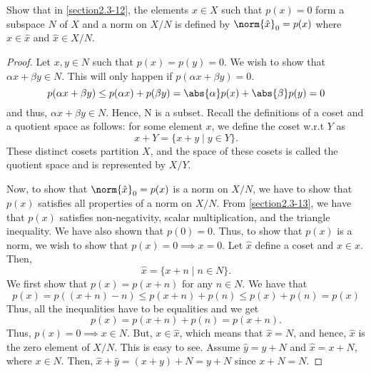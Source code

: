 \begin{question}
    Show that in \ref{section2.3-12}, the elements $x \in X$ such that $p(x) = 0$ form a subspace $N$ of $X$ and a norm on $X/N$ is defined by $\norm{\hat{x}}_0 = p(x)$ where $x \in \hat{x}$ and $\hat{x} \in X/N$.
    \label{section2.3-13}
\end{question}
\begin{proof}
    Let $x , y \in N$ such that $p(x) = p(y) = 0$. We wish to show that $\alpha x + \beta y \in N$. This will only happen if $p(\alpha x + \beta y) = 0$.
    \[p(\alpha x + \beta y) \leq p(\alpha x) + p(\beta y) = \abs{\alpha} p(x) + \abs{\beta} p(y) = 0\]
    and thus, $\alpha x + \beta y \in N$. Hence, N is a subset. Recall the definitions of a coset and a quotient space as follows: for some element $x$, we define the coset w.r.t $Y$ as
    \[x + Y = \{x + y \mid  y \in Y\}.\]
    These distinct cosets partition $X$, and the space of these cosets is called the quotient space and is represented by $X/Y$.

    Now, to show that $\norm{\hat{x}}_0 = p(x)$ is a norm on $X/N$, we have to show that $p(x)$ satisfies all properties of a norm on $X/N$. From \ref{section2.3-13}, we have that $p(x)$ satisfies non-negativity, scalar multiplication, and the triangle inequality. We have also shown that $p(0) = 0$. Thus, to show that $p(x)$ is a norm, we wish to show that $p(x)  = 0 \implies x = 0$. Let $\hat{x}$ define a coset and $x \in \hat{x}$. Then, 
    \[\hat{x} = \{x + n \mid n \in N\}.\]
    We first show that $p(x) = p(x + n)$ for any $n \in N$. We have that
    \[p(x) = p((x+n) - n) \leq p(x+n) + p(n) \leq p(x) + p(n) = p(x)\]
    Thus, all the inequalities have to be equalities and we get
    \[p(x)  = p(x+n) + p(n) = p(x+n).\]
    Thus, $p(x) = 0 \implies x \in N$. But, $x \in \hat{x}$, which means that $\hat{x} = N$, and hence, $\hat{x}$ is the zero element of $X/N$. This is easy to see. Assume $\hat{y} = y + N$ and $\hat{x} = x + N$, where $x \in N$. Then, $\hat{x} + \hat{y} = (x + y) + N = y + N$ since $x + N = N$.
\end{proof}

